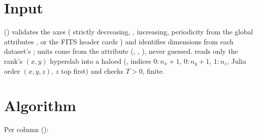 \section{Input}
 () validates the axes ( strictly decreasing, ,  increasing,
periodicity from the global attributes ,  or the FITS header cards
) and identifies dimensions from each dataset's
; units come from the  attribute (, , ), never
guessed.  reads only the rank's $(x,y)$ hyperslab into a haloed 
(, indices $0{:}n_x{+}1$, $0{:}n_y{+}1$, $1{:}n_z$, Julia order $(x,y,z)$, $z$ top first) and checks
$T>0$, finite.

\section{Algorithm}
Per column ():
